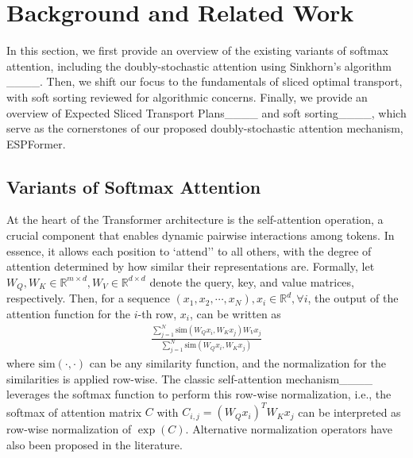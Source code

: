 \section{Background and Related Work}
In this section, we first provide an overview of the existing variants of softmax attention, including the doubly-stochastic attention using Sinkhorn's algorithm ____. Then, we shift our focus to the fundamentals of sliced optimal transport, with soft sorting reviewed for algorithmic concerns. Finally, we provide an overview of Expected Sliced Transport Plans____ and soft sorting____, which serve as the cornerstones of our proposed doubly-stochastic attention mechanism, ESPFormer.




\subsection{Variants of Softmax Attention}
\label{sec:attention}
At the heart of the Transformer architecture is the self-attention operation, a crucial component that enables dynamic pairwise interactions among tokens. In essence, it allows each position to `attend'' to all others, with the degree of attention determined by how similar their representations are. Formally, let $W_Q, W_K\in \mathbb{R}^{m\times d}, W_V\in\mathbb{R}^{d\times d}$ denote the query, key, and value matrices, respectively. Then, for a sequence $(x_1, x_2, \cdots, x_N), x_i \in \mathbb{R}^d, \forall i$, the output of the attention function for the $i$-th row, $x_i$, can be written as
\begin{align}
    \label{eq: generalized normalization}
    \frac{\sum_{j=1}^N\text{sim}(W_Qx_i, W_Kx_j)W_Vx_j}{\sum_{j=1}^N\text{sim}(W_Qx_i, W_Kx_j)}
\end{align}
where $\text{sim}(\cdot, \cdot)$ can be any similarity function, and the normalization for the similarities is applied row-wise. The classic self-attention mechanism____ leverages the softmax function to perform this row-wise normalization, i.e., the softmax of attention matrix $C$ with $C_{i,j}=(W_Qx_i)^TW_Kx_j$ can be interpreted as row-wise normalization of $\exp(C)$. 
Alternative normalization operators have also been proposed in the literature. 
